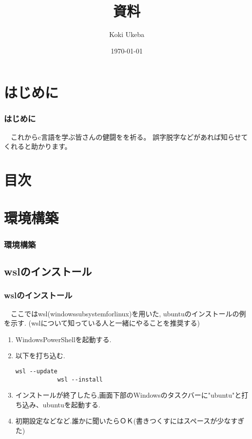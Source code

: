 \documentclass[dvipdfmx]{beamer}
\title{資料}
\author{Koki Ukeba}
\date{\today}
\begin{document}
\maketitle

\section{はじめに}
\begin{frame}[c, label=2]
    \frametitle{はじめに}
    　これからc言語を学ぶ皆さんの健闘をを祈る。
    誤字脱字などがあれば知らせてくれると助かります。
\end{frame}

\section{目次}
\tableofcontents

\section{環境構築}
\begin{frame}[label=4]
        \frametitle{環境構築}
        \tableofcontents[sections={2,3}]
\end{frame}

\subsection{wslのインストール}
\begin{frame}[t, fragile, label=5]
    \frametitle{wslのインストール}
    　ここではwsl(windows\space subsystem\space for\space linux)を用いた,
    ubuntuのインストールの例を示す.
    (wslについて知っている人と一緒にやることを推奨する)
    \begin{enumerate}
        \item Windows\space PowerShellを起動する.
        \item 以下を打ち込む.
        \begin{lstlisting}[gobble=9, caption=Windows\space PowerShell]
            wsl --update
            wsl --install
        \end{lstlisting}
        \item インストールが終了したら,画面下部のWindowsのタスクバーに"ubuntu"と打ち込み、ubuntuを起動する.
        \item 初期設定などなど.誰かに聞いたらＯＫ(書きつくすにはスペースが少なすぎた)
    \end{enumerate}
    \vfill \hfill 
    \hyperlink{4}{}
    \space
    \hyperlink{6}{}
\end{frame}
\end{document}

